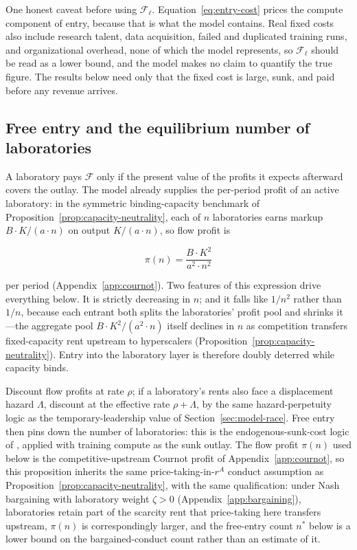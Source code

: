 \documentclass[11pt]{article}
\begin{document}
One honest caveat before using $\mathcal F_\ell$. Equation~\eqref{eq:entry-cost} prices the compute component of entry, because that is what the model contains. Real fixed costs also include research talent, data acquisition, failed and duplicated training runs, and organizational overhead, none of which the model represents, so $\mathcal F_\ell$ should be read as a lower bound, and the model makes no claim to quantify the true figure. The results below need only that the fixed cost is large, sunk, and paid before any revenue arrives.

\subsection{Free entry and the equilibrium number of laboratories}
\label{subsec:free-entry}

A laboratory pays $\mathcal F$ only if the present value of the profits it expects afterward covers the outlay. The model already supplies the per-period profit of an active laboratory: in the symmetric binding-capacity benchmark of Proposition~\ref{prop:capacity-neutrality}, each of $n$ laboratories earns markup $B\cdot K/(a\cdot n)$ on output $K/(a\cdot n)$, so flow profit is

\begin{equation}\pi(n)=\frac{B\cdot K^{2}}{a^{2}\cdot n^{2}}\end{equation}

per period (Appendix~\ref{app:cournot}). Two features of this expression drive everything below. It is strictly decreasing in $n$; and it falls like $1/n^{2}$ rather than $1/n$, because each entrant both splits the laboratories' profit pool and shrinks it---the aggregate pool $B\cdot K^{2}/(a^{2}\cdot n)$ itself declines in $n$ as competition transfers fixed-capacity rent upstream to hyperscalers (Proposition~\ref{prop:capacity-neutrality}). Entry into the laboratory layer is therefore doubly deterred while capacity binds.

Discount flow profits at rate $\rho$; if a laboratory's rents also face a displacement hazard $\Lambda$, discount at the effective rate $\rho+\Lambda$, by the same hazard-perpetuity logic as the temporary-leadership value of Section~\ref{sec:model-race}. Free entry then pins down the number of laboratories: this is the endogenous-sunk-cost logic of \citet{sutton1991}, applied with training compute as the sunk outlay. The flow profit $\pi(n)$ used below is the competitive-upstream Cournot profit of Appendix~\ref{app:cournot}, so this proposition inherits the same price-taking-in-$r^A$ conduct assumption as Proposition~\ref{prop:capacity-neutrality}, with the same qualification: under Nash bargaining with laboratory weight $\zeta>0$ (Appendix~\ref{app:bargaining}), laboratories retain part of the scarcity rent that price-taking here transfers upstream, $\pi(n)$ is correspondingly larger, and the free-entry count $n^*$ below is a lower bound on the bargained-conduct count rather than an estimate of it.
\end{document}
